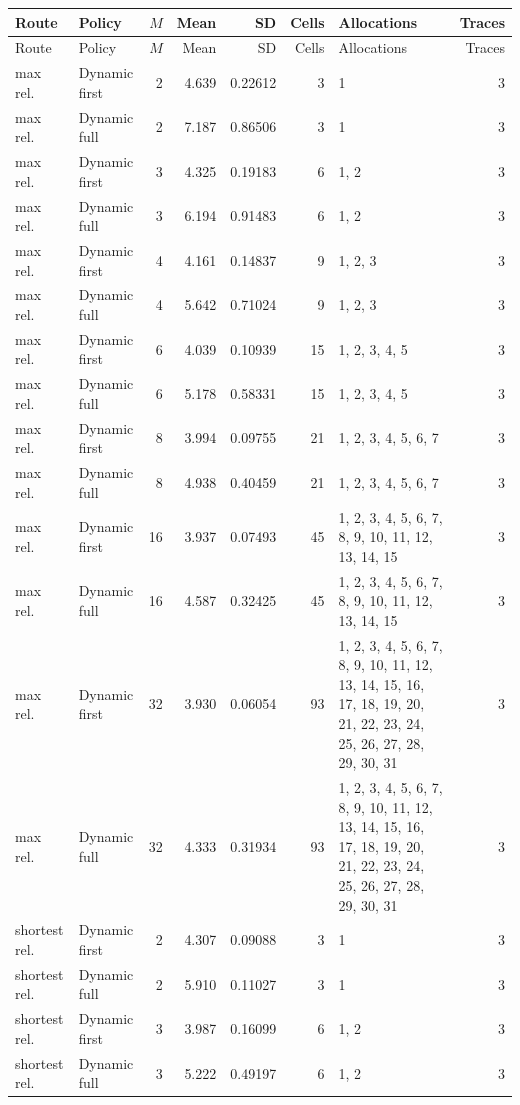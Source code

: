 \documentclass[10pt,a4paper]{article}
\begin{document}
\tiny\setlength{\tabcolsep}{2pt}\begin{longtable}{@{}p{23mm}p{29mm}rrrrp{36mm}r@{}}
\toprule Route & Policy & $M$ & Mean & SD & Cells & Allocations & Traces \\ \midrule\endfirsthead
\toprule Route & Policy & $M$ & Mean & SD & Cells & Allocations & Traces \\ \midrule\endhead
\bottomrule\endfoot
max rel. & Dynamic first & 2 & 4.639 & 0.22612 & 3 & 1 & 3 \\
max rel. & Dynamic full & 2 & 7.187 & 0.86506 & 3 & 1 & 3 \\
max rel. & Dynamic first & 3 & 4.325 & 0.19183 & 6 & 1, 2 & 3 \\
max rel. & Dynamic full & 3 & 6.194 & 0.91483 & 6 & 1, 2 & 3 \\
max rel. & Dynamic first & 4 & 4.161 & 0.14837 & 9 & 1, 2, 3 & 3 \\
max rel. & Dynamic full & 4 & 5.642 & 0.71024 & 9 & 1, 2, 3 & 3 \\
max rel. & Dynamic first & 6 & 4.039 & 0.10939 & 15 & 1, 2, 3, 4, 5 & 3 \\
max rel. & Dynamic full & 6 & 5.178 & 0.58331 & 15 & 1, 2, 3, 4, 5 & 3 \\
max rel. & Dynamic first & 8 & 3.994 & 0.09755 & 21 & 1, 2, 3, 4, 5, 6, 7 & 3 \\
max rel. & Dynamic full & 8 & 4.938 & 0.40459 & 21 & 1, 2, 3, 4, 5, 6, 7 & 3 \\
max rel. & Dynamic first & 16 & 3.937 & 0.07493 & 45 & 1, 2, 3, 4, 5, 6, 7, 8, 9, 10, 11, 12, 13, 14, 15 & 3 \\
max rel. & Dynamic full & 16 & 4.587 & 0.32425 & 45 & 1, 2, 3, 4, 5, 6, 7, 8, 9, 10, 11, 12, 13, 14, 15 & 3 \\
max rel. & Dynamic first & 32 & 3.930 & 0.06054 & 93 & 1, 2, 3, 4, 5, 6, 7, 8, 9, 10, 11, 12, 13, 14, 15, 16, 17, 18, 19, 20, 21, 22, 23, 24, 25, 26, 27, 28, 29, 30, 31 & 3 \\
max rel. & Dynamic full & 32 & 4.333 & 0.31934 & 93 & 1, 2, 3, 4, 5, 6, 7, 8, 9, 10, 11, 12, 13, 14, 15, 16, 17, 18, 19, 20, 21, 22, 23, 24, 25, 26, 27, 28, 29, 30, 31 & 3 \\
shortest rel. & Dynamic first & 2 & 4.307 & 0.09088 & 3 & 1 & 3 \\
shortest rel. & Dynamic full & 2 & 5.910 & 0.11027 & 3 & 1 & 3 \\
shortest rel. & Dynamic first & 3 & 3.987 & 0.16099 & 6 & 1, 2 & 3 \\
shortest rel. & Dynamic full & 3 & 5.222 & 0.49197 & 6 & 1, 2 & 3 \\

\end{longtable}
\end{document}
